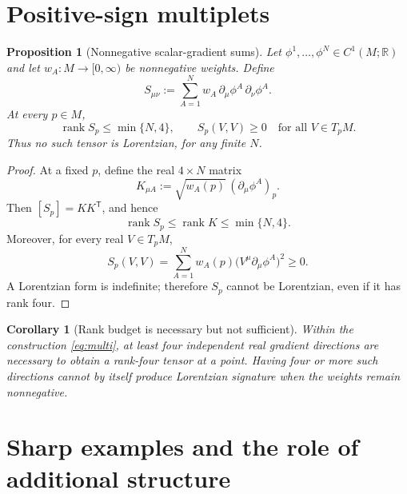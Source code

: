 \documentclass[11pt]{article}
\newtheorem{proposition}{Proposition}
\newtheorem{corollary}{Corollary}
\theoremstyle{remark}
\newcommand{\rank}{\operatorname{rank}}
\begin{document}
\section{Positive-sign multiplets}

\begin{proposition}[Nonnegative scalar-gradient sums]\label{prop:multiplet}
Let $\phi^1,\dots,\phi^N\in C^1(M;\mathbb R)$ and let
$w_A:M\to[0,\infty)$ be nonnegative weights.  Define
\begin{equation}\label{eq:multi}
 S_{\mu\nu}:=\sum_{A=1}^N w_A\,
   \partial_\mu\phi^A\,\partial_\nu\phi^A.
\end{equation}
At every $p\in M$,
\begin{equation}
 \rank S_p\leq\min\{N,4\},\qquad
 S_p(V,V)\geq 0\quad\text{for all }V\in T_pM.
\end{equation}
Thus no such tensor is Lorentzian, for any finite $N$.
\end{proposition}

\begin{proof}
At a fixed $p$, define the real $4\times N$ matrix
\begin{equation}
 K_{\mu A}:=\sqrt{w_A(p)}\,(\partial_\mu\phi^A)_p.
\end{equation}
Then $[S_p]=KK^{\mathsf T}$, and hence
\begin{equation}
 \rank S_p\leq\rank K\leq\min\{N,4\}.
\end{equation}
Moreover, for every real $V\in T_pM$,
\begin{equation}
 S_p(V,V)=\sum_{A=1}^N w_A(p)
 \bigl(V^\mu\partial_\mu\phi^A\bigr)^2\geq 0.
\end{equation}
A Lorentzian form is indefinite; therefore $S_p$ cannot be
Lorentzian, even if it has rank four.
\end{proof}

\begin{corollary}[Rank budget is necessary but not sufficient]
Within the construction \eqref{eq:multi}, at least four independent
real gradient directions are necessary to obtain a rank-four tensor
at a point.  Having four or more such directions cannot by itself
produce Lorentzian signature when the weights remain nonnegative.
\end{corollary}

\section{Sharp examples and the role of additional structure}
\end{document}

